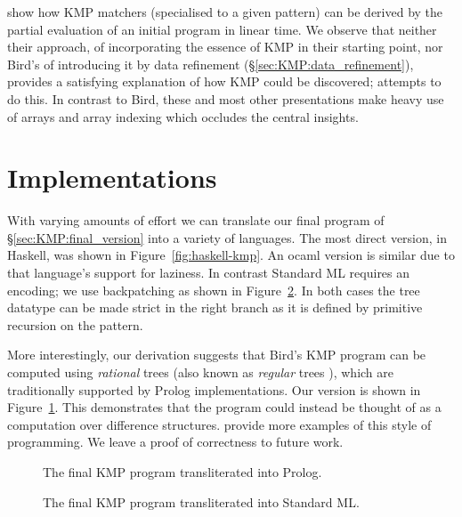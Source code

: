 \documentclass[11pt,a4paper]{article}
\begin{document}
\citet{AgerDanvyRohde:2006} show how KMP matchers (specialised to a
given pattern) can be derived by the partial evaluation of an initial
program in linear time. We observe that neither their approach, of
incorporating the essence of KMP in their starting point, nor Bird's
of introducing it by data refinement
(\S\ref{sec:KMP:data_refinement}), provides a satisfying explanation
of how KMP could be discovered; \citet{Pottier:2012} attempts to do
this. In contrast to Bird, these and most other presentations make
heavy use of arrays and array indexing which occludes the central
insights.


\section{Implementations\label{sec:implementations}}

With varying amounts of effort we can translate our final program of
\S\ref{sec:KMP:final_version} into a variety of languages. The most
direct version, in Haskell, was shown in
Figure~\ref{fig:haskell-kmp}. An ocaml version is similar due to that
language's support for laziness. In contrast Standard ML requires an
encoding; we use backpatching as shown in Figure~\ref{fig:sml-kmp}. In
both cases the tree datatype can be made strict in the right branch as
it is defined by primitive recursion on the pattern.

More interestingly, our derivation suggests that Bird's KMP program
can be computed using \emph{rational} trees (also known as
\emph{regular} trees \citep{Courcelle:1983}), which are traditionally
supported by Prolog implementations. Our version is shown in
Figure~\ref{fig:prolog-kmp}. This demonstrates that the program could
instead be thought of as a computation over difference
structures. \citet{Colmerauer:1982,GiannesiniCohen:1984} provide more
examples of this style of programming. We leave a proof of correctness
to future work.

\begin{figure}
  \caption{The final KMP program transliterated into Prolog.}
  \label{fig:prolog-kmp}
\end{figure}

\begin{figure}
  \caption{The final KMP program transliterated into Standard ML.}
  \label{fig:sml-kmp}
\end{figure}
\end{document}
